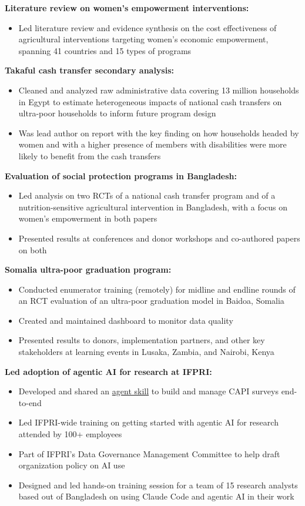 \documentclass[a4paper,11pt]{article}
\newcommand{\substart}{\begin{itemize}[leftmargin=*,labelsep=1mm,itemsep=0.2mm,topsep=0.3mm,nosep,label=\textasteriskcentered]}
\newcommand{\subend}{\end{itemize}}
\newcommand{\cvitem}[2]{\item \textbf{#1} #2}
\begin{document}
  \cvitem{Literature review on women's empowerment interventions:}{}
  \substart
  \item Led literature review and evidence synthesis on the cost effectiveness of agricultural interventions targeting women's economic empowerment, spanning 41 countries and 15 types of programs
  \subend

  \cvitem{Takaful cash transfer secondary analysis:}{}
  \substart
  \item Cleaned and analyzed raw administrative data covering 13 million households in Egypt to estimate heterogeneous impacts of  national cash transfers on ultra-poor households to inform future program design
  \item Was lead author on report with the key finding on how households headed by women and with a higher presence of members with disabilities were more likely to benefit from the cash transfers
  \subend

  \cvitem{Evaluation of social protection programs in Bangladesh:}{}
  \substart
  \item Led analysis on two RCTs of a national cash transfer program and of a nutrition-sensitive agricultural intervention in Bangladesh, with a focus on women's empowerment in both papers
  \item Presented results at conferences and donor workshops and co-authored papers on both
  \subend

  \cvitem{Somalia ultra-poor graduation program:}{}
  \substart
  \item Conducted enumerator training (remotely) for midline and endline rounds of an RCT evaluation of an ultra-poor graduation model in Baidoa, Somalia
  \item Created and maintained dashboard to monitor data quality
  \item Presented results to donors, implementation partners, and other key stakeholders at learning events in Lusaka, Zambia, and Nairobi, Kenya

  \subend

  \cvitem{Led adoption of agentic AI for research at IFPRI:}{}
  \substart
    \item Developed and shared an \href{https://github.com/meanregressive/capi-form-lifecycle}{agent skill} to build and manage CAPI surveys end-to-end
  \item Led IFPRI-wide training on getting started with agentic AI for research attended by 100+ employees
  \item Part of IFPRI's Data Governance Management Committee to help draft organization policy on AI use
  \item Designed and led hands-on training session for a team of 15 research analysts based out of Bangladesh on using Claude Code and agentic AI in their work
  \subend
\end{document}
